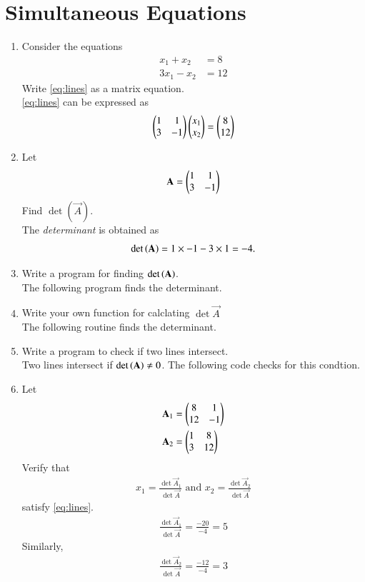 \documentclass[journal,12pt,twocolumn]{IEEEtran}
\renewcommand\thesection{\arabic{section}}
\begin{document}
\section{Simultaneous Equations}
\begin{enumerate}[label=\thesection.\arabic*
,ref=\thesection.\theenumi]
%
\item Consider the equations
\begin{align}
\label{eq:lines}
 x_1 +x_2&=8
\\
 3x_1 -x_2&=12
\end{align}
Write \eqref{eq:lines} as a matrix equation.
\\
\solution \eqref{eq:lines} can be expressed as
\begin{align}
\label{eq:matrix}
\begin{pmatrix}1 & 1 \\ 3 & -1\end{pmatrix}\begin{pmatrix}x_1 \\x_2\end{pmatrix} = \begin{pmatrix}8 \\12\end{pmatrix}
\end{align}
\item Let 
\begin{align}
\label{eq:matrix_det}
\mathbf{A}= \begin{pmatrix}1 & 1 \\ 3 & -1\end{pmatrix}
\end{align}
Find $\det(\vec{A})$.
\\
\solution The {\em determinant} is obtained as
\begin{equation}
\det\left(\mathbf{A}\right) = 1 \times -1 - 3 \times 1 = -4.
\end{equation}
%
\item Write a program for finding $\det\left(\mathbf{A}\right)$.
\\
\solution The following program finds the determinant.

\item Write your own function for calclating $\det{\vec{A}}$
\\
\solution The following routine finds the determinant.

\item Write a program to check if two lines intersect.
\\
\solution Two lines intersect if $\det\left(\mathbf{A}\right) \ne 0$.  The following
code checks for this condtion.

\item Let
\begin{align}
\label{eq:matrix_cramer}
\mathbf{A}_1 &= \begin{pmatrix}8 & 1 \\ 12 & -1\end{pmatrix}
\\
\mathbf{A}_2&= \begin{pmatrix}1 & 8 \\ 3 & 12\end{pmatrix}
\end{align}
%
Verify that 
\begin{align}
\label{eq:sol_det}
x_1 = \frac{\det{\vec{A}_1}}{\det{\vec{A}}} \text{ and } x_2 = \frac{\det{\vec{A}_2}}{\det{\vec{A}}}
\end{align}
satisfy \eqref{eq:lines}.
\\
\solution 
\begin{align}
\frac{\det{\vec{A}_1}}{\det{\vec{A}}}  = \frac{-20}{-4} = 5
\end{align}
Similarly, 
\begin{align}
\frac{\det{\vec{A}_2}}{\det{\vec{A}}}  = \frac{-12}{-4} = 3
\end{align}
%


\end{enumerate}
\end{document}
